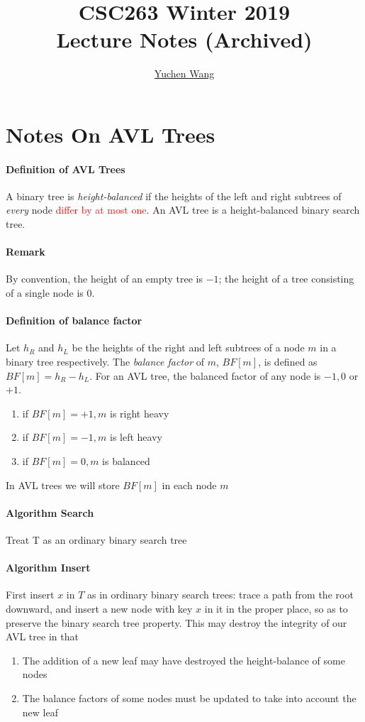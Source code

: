 \documentclass[11pt]{article}
\title{CSC263 Winter 2019\\ Lecture Notes (Archived)}
\author{\textcolor{blue}{\href{https://www.yuchenwyc.com}{Yuchen Wang}}}
\newcommand{\ti}[1]{\textit{#1}}
\begin{document}
	\maketitle
	\tableofcontents
	\newpage
	\section{Notes On AVL Trees}
	\paragraph{Definition of AVL Trees} A binary tree is \ti{height-balanced} if the heights of the left and right subtrees of \ti{every} node \textcolor{red}{differ by at most one}. An AVL tree is a height-balanced binary search tree.
	\paragraph{Remark} By convention, the height of an empty tree is $-1$; the height of a tree consisting of a single node is $0$.
	\paragraph{Definition of balance factor} Let $h_R$ and $h_L$ be the heights of the right and left subtrees of a node $m$ in a binary tree respectively. The \ti{balance factor} of $m$, $BF[m]$, is defined as $BF[m] = h_R - h_L$. \newline
	For an AVL tree, the balanced factor of any node is $-1, 0$ or $+1$. \newline
	\begin{enumerate}
		\item if $BF[m] = +1, m$ is right heavy
		\item if $BF[m] = -1, m$ is left heavy
		\item if $BF[m] = 0, m$ is balanced
	\end{enumerate}
	In AVL trees we will store $BF[m]$ in each node $m$
	\paragraph{Algorithm Search}
	Treat T as an ordinary binary search tree
	\paragraph{Algorithm Insert}
	First insert $x$ in $T$ as in ordinary binary search trees: trace a path from the root downward, and insert a new node with key $x$ in it in the proper place, so as to preserve the binary search tree property. This may destroy the integrity of our AVL tree in that 
	\begin{enumerate}
		\item The addition of a new leaf may have destroyed the height-balance of some nodes
		\item The balance factors of some nodes must be updated to take into account the new leaf
	\end{enumerate}
\end{document}
